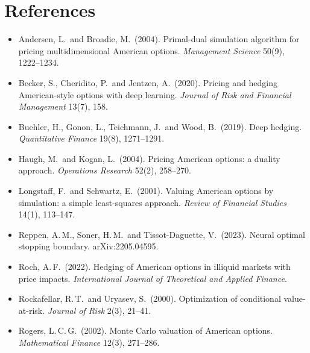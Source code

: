 \documentclass[11pt]{article}
\theoremstyle{definition}
\theoremstyle{remark}
\begin{document}
\section*{References}
\begin{itemize}[leftmargin=*,label={}]
\item Andersen, L.\ and Broadie, M.\ (2004). Primal-dual simulation algorithm for pricing multidimensional
  American options. \emph{Management Science} 50(9), 1222--1234.
\item Becker, S., Cheridito, P.\ and Jentzen, A.\ (2020). Pricing and hedging American-style options with
  deep learning. \emph{Journal of Risk and Financial Management} 13(7), 158.
\item Buehler, H., Gonon, L., Teichmann, J.\ and Wood, B.\ (2019). Deep hedging. \emph{Quantitative
  Finance} 19(8), 1271--1291.
\item Haugh, M.\ and Kogan, L.\ (2004). Pricing American options: a duality approach. \emph{Operations
  Research} 52(2), 258--270.
\item Longstaff, F.\ and Schwartz, E.\ (2001). Valuing American options by simulation: a simple
  least-squares approach. \emph{Review of Financial Studies} 14(1), 113--147.
\item Reppen, A.\,M., Soner, H.\,M.\ and Tissot-Daguette, V.\ (2023). Neural optimal stopping boundary.
  arXiv:2205.04595.
\item Roch, A.\,F.\ (2022). Hedging of American options in illiquid markets with price impacts.
  \emph{International Journal of Theoretical and Applied Finance}.
\item Rockafellar, R.\,T.\ and Uryasev, S.\ (2000). Optimization of conditional value-at-risk.
  \emph{Journal of Risk} 2(3), 21--41.
\item Rogers, L.\,C.\,G.\ (2002). Monte Carlo valuation of American options. \emph{Mathematical Finance}
  12(3), 271--286.
\end{itemize}
\end{document}
